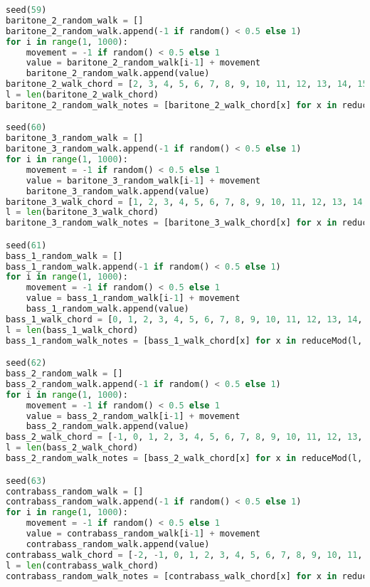 \begin{lstlisting}[language=Python, caption=Invocation Source Code]
seed(59)
baritone_2_random_walk = []
baritone_2_random_walk.append(-1 if random() < 0.5 else 1)
for i in range(1, 1000):
    movement = -1 if random() < 0.5 else 1
    value = baritone_2_random_walk[i-1] + movement
    baritone_2_random_walk.append(value)
baritone_2_walk_chord = [2, 3, 4, 5, 6, 7, 8, 9, 10, 11, 12, 13, 14, 15, 16, 17, 18, 19, 20, 21, 22, 21, 20, 19, 18, 17, 16, 15, 14, 13, 12, 11, 10, 9, 8, 7, 6, 5, 4, 3, 2, 1, 0, -1, -2, -1, 0, 1, ]
l = len(baritone_2_walk_chord)
baritone_2_random_walk_notes = [baritone_2_walk_chord[x] for x in reduceMod(l, baritone_2_random_walk)]

seed(60)
baritone_3_random_walk = []
baritone_3_random_walk.append(-1 if random() < 0.5 else 1)
for i in range(1, 1000):
    movement = -1 if random() < 0.5 else 1
    value = baritone_3_random_walk[i-1] + movement
    baritone_3_random_walk.append(value)
baritone_3_walk_chord = [1, 2, 3, 4, 5, 6, 7, 8, 9, 10, 11, 12, 13, 14, 15, 16, 17, 18, 19, 20, 21, 22, 21, 20, 19, 18, 17, 16, 15, 14, 13, 12, 11, 10, 9, 8, 7, 6, 5, 4, 3, 2, 1, 0, -1, -2, -1, 0, ]
l = len(baritone_3_walk_chord)
baritone_3_random_walk_notes = [baritone_3_walk_chord[x] for x in reduceMod(l, baritone_3_random_walk)]

seed(61)
bass_1_random_walk = []
bass_1_random_walk.append(-1 if random() < 0.5 else 1)
for i in range(1, 1000):
    movement = -1 if random() < 0.5 else 1
    value = bass_1_random_walk[i-1] + movement
    bass_1_random_walk.append(value)
bass_1_walk_chord = [0, 1, 2, 3, 4, 5, 6, 7, 8, 9, 10, 11, 12, 13, 14, 15, 16, 17, 18, 19, 20, 21, 22, 21, 20, 19, 18, 17, 16, 15, 14, 13, 12, 11, 10, 9, 8, 7, 6, 5, 4, 3, 2, 1, 0, -1, -2, -1, ]
l = len(bass_1_walk_chord)
bass_1_random_walk_notes = [bass_1_walk_chord[x] for x in reduceMod(l, bass_1_random_walk)]

seed(62)
bass_2_random_walk = []
bass_2_random_walk.append(-1 if random() < 0.5 else 1)
for i in range(1, 1000):
    movement = -1 if random() < 0.5 else 1
    value = bass_2_random_walk[i-1] + movement
    bass_2_random_walk.append(value)
bass_2_walk_chord = [-1, 0, 1, 2, 3, 4, 5, 6, 7, 8, 9, 10, 11, 12, 13, 14, 15, 16, 17, 18, 19, 20, 21, 22, 21, 20, 19, 18, 17, 16, 15, 14, 13, 12, 11, 10, 9, 8, 7, 6, 5, 4, 3, 2, 1, 0, -1, -2, ]
l = len(bass_2_walk_chord)
bass_2_random_walk_notes = [bass_2_walk_chord[x] for x in reduceMod(l, bass_2_random_walk)]

seed(63)
contrabass_random_walk = []
contrabass_random_walk.append(-1 if random() < 0.5 else 1)
for i in range(1, 1000):
    movement = -1 if random() < 0.5 else 1
    value = contrabass_random_walk[i-1] + movement
    contrabass_random_walk.append(value)
contrabass_walk_chord = [-2, -1, 0, 1, 2, 3, 4, 5, 6, 7, 8, 9, 10, 11, 12, 13, 14, 15, 16, 17, 18, 19, 20, 21, 22, 21, 20, 19, 18, 17, 16, 15, 14, 13, 12, 11, 10, 9, 8, 7, 6, 5, 4, 3, 2, 1, 0, -1, ]
l = len(contrabass_walk_chord)
contrabass_random_walk_notes = [contrabass_walk_chord[x] for x in reduceMod(l, contrabass_random_walk)]


\end{lstlisting}
